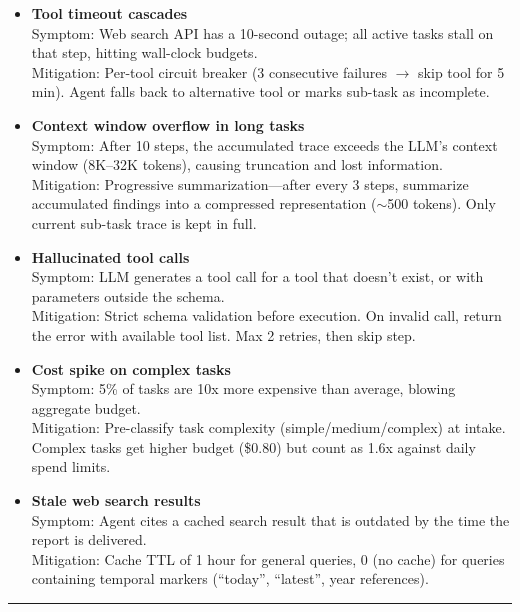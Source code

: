 \begin{itemize}
  \item \textbf{Tool timeout cascades}\\
    Symptom: Web search API has a 10-second outage; all active tasks stall on that step, hitting wall-clock budgets.\\
    Mitigation: Per-tool circuit breaker (3 consecutive failures $\rightarrow$ skip tool for 5 min). Agent falls back to alternative tool or marks sub-task as incomplete.

  \item \textbf{Context window overflow in long tasks}\\
    Symptom: After 10 steps, the accumulated trace exceeds the LLM's context window (8K--32K tokens), causing truncation and lost information.\\
    Mitigation: Progressive summarization---after every 3 steps, summarize accumulated findings into a compressed representation ($\sim$500 tokens). Only current sub-task trace is kept in full.

  \item \textbf{Hallucinated tool calls}\\
    Symptom: LLM generates a tool call for a tool that doesn't exist, or with parameters outside the schema.\\
    Mitigation: Strict schema validation before execution. On invalid call, return the error with available tool list. Max 2 retries, then skip step.

  \item \textbf{Cost spike on complex tasks}\\
    Symptom: 5\% of tasks are 10x more expensive than average, blowing aggregate budget.\\
    Mitigation: Pre-classify task complexity (simple/medium/complex) at intake. Complex tasks get higher budget (\$0.80) but count as 1.6x against daily spend limits.

  \item \textbf{Stale web search results}\\
    Symptom: Agent cites a cached search result that is outdated by the time the report is delivered.\\
    Mitigation: Cache TTL of 1 hour for general queries, 0 (no cache) for queries containing temporal markers (``today'', ``latest'', year references).
\end{itemize}

\bigskip\hrule\bigskip


